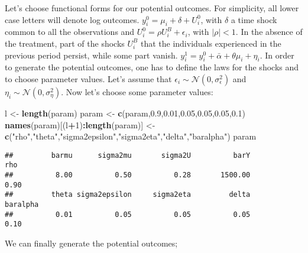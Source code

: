 \documentclass[]{book}
\newenvironment{Shaded}{\begin{snugshade}}{\end{snugshade}}
\newcommand{\KeywordTok}[1]{\textcolor[rgb]{0.13,0.29,0.53}{\textbf{#1}}}
\newcommand{\DecValTok}[1]{\textcolor[rgb]{0.00,0.00,0.81}{#1}}
\newcommand{\FloatTok}[1]{\textcolor[rgb]{0.00,0.00,0.81}{#1}}
\newcommand{\StringTok}[1]{\textcolor[rgb]{0.31,0.60,0.02}{#1}}
\newcommand{\OperatorTok}[1]{\textcolor[rgb]{0.81,0.36,0.00}{\textbf{#1}}}
\newcommand{\NormalTok}[1]{#1}
\theoremstyle{definition}
\theoremstyle{definition}
\theoremstyle{definition}
\theoremstyle{remark}
\let\BeginKnitrBlock\begin \let\EndKnitrBlock\end
\begin{document}
\BeginKnitrBlock{example}
\protect\hypertarget{exm:unnamed-chunk-3}{}{\label{exm:unnamed-chunk-3}
}Let's choose functional forms for our potential outcomes. For
simplicity, all lower case letters will denote log outcomes.
\(y_i^0=\mu_i+\delta+U_i^0\), with \(\delta\) a time shock common to all
the observations and \(U_i^0=\rho U_i^B+\epsilon_i\), with \(|\rho|<1\).
In the absence of the treatment, part of the shocks \(U_i^B\) that the
individuals experienced in the previous period persist, while some part
vanish. \(y_i^1=y_i^0+\bar{\alpha}+\theta\mu_i+\eta_i\). In order to
generate the potential outcomes, one has to define the laws for the
shocks and to choose parameter values. Let's assume that
\(\epsilon_i\sim\mathcal{N}(0,\sigma^2_{\epsilon})\) and
\(\eta_i\sim\mathcal{N}(0,\sigma^2_{\eta})\). Now let's choose some
parameter values:
\EndKnitrBlock{example}

\begin{Shaded}
\begin{Highlighting}[]
\NormalTok{l <-}\StringTok{ }\KeywordTok{length}\NormalTok{(param)}
\NormalTok{param <-}\StringTok{ }\KeywordTok{c}\NormalTok{(param,}\FloatTok{0.9}\NormalTok{,}\FloatTok{0.01}\NormalTok{,}\FloatTok{0.05}\NormalTok{,}\FloatTok{0.05}\NormalTok{,}\FloatTok{0.05}\NormalTok{,}\FloatTok{0.1}\NormalTok{)}
\KeywordTok{names}\NormalTok{(param)[(l}\OperatorTok{+}\DecValTok{1}\NormalTok{)}\OperatorTok{:}\KeywordTok{length}\NormalTok{(param)] <-}\StringTok{ }\KeywordTok{c}\NormalTok{(}\StringTok{"rho"}\NormalTok{,}\StringTok{"theta"}\NormalTok{,}\StringTok{"sigma2epsilon"}\NormalTok{,}\StringTok{"sigma2eta"}\NormalTok{,}\StringTok{"delta"}\NormalTok{,}\StringTok{"baralpha"}\NormalTok{)}
\NormalTok{param}
\end{Highlighting}
\end{Shaded}

\begin{verbatim}
##         barmu      sigma2mu       sigma2U          barY           rho 
##          8.00          0.50          0.28       1500.00          0.90 
##         theta sigma2epsilon     sigma2eta         delta      baralpha 
##          0.01          0.05          0.05          0.05          0.10
\end{verbatim}

We can finally generate the potential outcomes;
\end{document}
